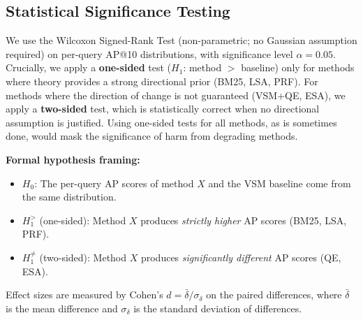 \documentclass{article}
\begin{document}
\subsection{Statistical Significance Testing}

We use the Wilcoxon Signed-Rank Test (non-parametric; no Gaussian assumption required) on per-query AP@10 distributions, with significance level $\alpha = 0.05$. Crucially, we apply a \textbf{one-sided} test ($H_1$: method $>$ baseline) only for methods where theory provides a strong directional prior (BM25, LSA, PRF). For methods where the direction of change is not guaranteed (VSM+QE, ESA), we apply a \textbf{two-sided} test, which is statistically correct when no directional assumption is justified. Using one-sided tests for all methods, as is sometimes done, would mask the significance of harm from degrading methods.

\textbf{Formal hypothesis framing:}

\begin{itemize}[noitemsep]
    \item $H_0$: The per-query AP scores of method $X$ and the VSM baseline come from the same distribution.
    \item $H_1^{>}$ (one-sided): Method $X$ produces \emph{strictly higher} AP scores (BM25, LSA, PRF).
    \item $H_1^{\neq}$ (two-sided): Method $X$ produces \emph{significantly different} AP scores (QE, ESA).
\end{itemize}

Effect sizes are measured by Cohen's $d = \bar{\delta} / \sigma_\delta$ on the paired differences, where $\bar{\delta}$ is the mean difference and $\sigma_\delta$ is the standard deviation of differences.
\end{document}
